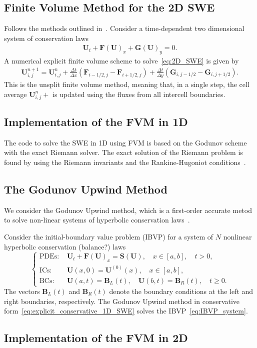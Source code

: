 \subsection{Finite Volume Method for the 2D SWE}
Follows the methods outlined in~\cite{Toro2009-Riemann}.
Consider a time-dependent two dimensional system of conservation laws
\begin{align}\label{eq:2D_SWE}
    \mathbf{U}_t + \mathbf{F(U)}_x + \mathbf{G(U)}_y = 0.
\end{align}
A numerical explicit finite volume scheme to solve~\eqref{eq:2D_SWE} is given by
\begin{align}
    \mathbf{U}_{i,j}^{n+1} = \mathbf{U}_{i,j}^n + \frac{\Delta t}{\Delta x}(\mathbf{F}_{i-1/2,j} - \mathbf{F}_{i+1/2,j}) + \frac{\Delta t}{\Delta y}(\mathbf{G}_{i,j-1/2} - \mathbf{G}_{i,j+1/2}).
\end{align}
This is the unsplit finite volume method, meaning that, in a single step, the cell average $\mathbf{U}_{i,j}^n+$ is updated using the fluxes from all intercell boundaries.


\subsection{Implementation of the FVM in 1D}
The code to solve the SWE in 1D using FVM is based on the Godunov scheme with the exact Riemann solver.
The exact solution of the Riemann problem is found by using the Riemann invariants and the Rankine-Hugoniot conditions~\cite{trento_course}.

\subsection{The Godunov Upwind Method}
We consider the Godunov Upwind method, which is a first-order accurate metod to solve non-linear systems of hyperbolic conservation laws~\cite{Toro2024}.

Consider the initial-boundary value problem (IBVP) for a system of $N$ nonlinear hyperbolic conservation (balance?) laws     
\begin{equation}\label{eq:IBVP_system}
    \begin{cases}
    \text{PDEs: }    &\mathbf{U}_t + \mathbf{F(U)}_x = \mathbf{S(U)}, \quad x \in [a, b], \quad t > 0, \\
    \text{ICs: }    &\mathbf{U}(x,0) = \mathbf{U}^{(0)}(x), \quad x \in [a,b], \\
    \text{BCs: }    &\mathbf{U}(a,t) = \mathbf{B}_{L}(t), \quad \mathbf{U}(b,t) = \mathbf{B}_{R}(t), \quad t \geq 0.
    \end{cases}
\end{equation}
The vectors $\mathbf{B}_L (t)$ and $\mathbf{B}_R (t)$ denote the boundary conditions at the left and right boundaries, respectively.
The Godunov Upwind method in conservative form~\eqref{eq:explicit_conservative_1D_SWE} solves the IBVP~\eqref{eq:IBVP_system}.


\subsection{Implementation of the FVM in 2D}






